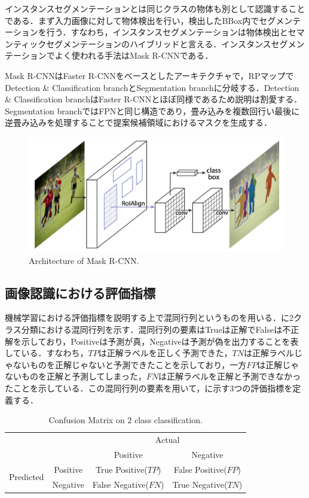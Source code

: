 インスタンスセグメンテーションとは同じクラスの物体も別として認識することである．まず入力画像に対して物体検出を行い，検出したBBox内でセグメンテーションを行う．すなわち，インスタンスセグメンテーションは物体検出とセマンティックセグメンテーションのハイブリッドと言える．インスタンスセグメンテーションでよく使われる手法はMask R-CNNである\cite{MaskRCNN}．

Mask R-CNNはFaster R-CNNをベースとしたアーキテクチャで，RPマップでDetection \& Classification branchとSegmentation branchに分岐する．Detection \& Classification branchはFaster R-CNNとほぼ同様であるため説明は割愛する．Segmentation branchではFPN\cite{FPN}と同じ構造であり，畳み込みを複数回行い最後に逆畳み込みを処理することで提案候補領域におけるマスクを生成する．

\begin{figure}[H]
    \centering
    \includegraphics[width=0.7\linewidth]{figure/chapter2/mrcnn}
    \caption[Architecture of Mask R-CNN.]{Architecture of Mask R-CNN\cite{MaskRCNN}.}
    \label{fig:mrcnn}
\end{figure}



\subsection{画像認識における評価指標}
機械学習における評価指標を説明する上で混同行列というものを用いる．に2クラス分類における混同行列を示す．混同行列の要素はTrueは正解でFalseは不正解を示しており，Positiveは予測が真，Negativeは予測が偽を出力することを表している．すなわち，$TP$は正解ラベルを正しく予測できた，$TN$は正解ラベルじゃないものを正解じゃないと予測できたことを示しており，一方$FP$は正解じゃないものを正解と予測してしまった，$FN$は正解ラベルを正解と予測できなかったことを示している．この混同行列の要素を用いて，に示す3つの評価指標を定義する．

\begin{table}
    \centering
    \caption{Confusion Matrix on 2 class classification.}
    \begin{tabular}{|c|c|c|c|}\hline
        \multicolumn{2}{|c|}{} & \multicolumn{2}{c|}{Actual} \\ \cline{3-4}        \multicolumn{2}{|c|}{} & Positive & Negative \\ \hline
        \multirow{2}{*}{Predicted} & Positive & True Positive($TP$) & False Positive($FP$) \\ \cline{2-4}
        & Negative & False Negative($FN$) & True Negative($TN$) \\ \hline
    \end{tabular} 
    \label{tab:混同行列}
\end{table}

